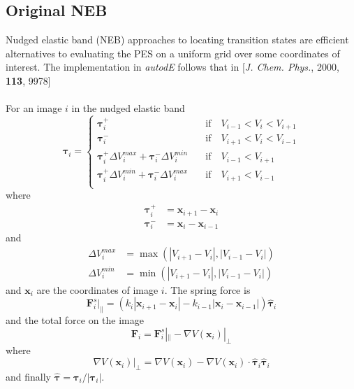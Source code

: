 \documentclass[10pt]{article}
\begin{document}
\subsection{Original NEB}

Nudged elastic band (NEB) approaches to locating transition states are efficient alternatives to evaluating the PES on a uniform grid over some coordinates of interest. The implementation in \emph{autodE} follows that in [\emph{J. Chem. Phys.}, 2000, {\bfseries{113}}, 9978]
\\\\
For an image $i$ in the nudged elastic band
\begin{equation}
\boldsymbol{\tau}_i =
\begin{cases}
\boldsymbol{\tau}_i^+ &\quad\text{if}\quad V_{i-1} < V_i < V_{i+1} \\
\boldsymbol{\tau}_i^- &\quad\text{if}\quad V_{i+1} < V_i < V_{i-1} \\
\boldsymbol{\tau}_i^+\Delta V_i^{max} + \boldsymbol{\tau}_i^-\Delta V_i^{min} &\quad\text{if}\quad V_{i-1} <  V_{i+1} \\
\boldsymbol{\tau}_i^+\Delta V_i^{min} + \boldsymbol{\tau}_i^-\Delta V_i^{max} &\quad\text{if}\quad V_{i+1} < V_{i-1} \\
\end{cases}
\end{equation}
where
\begin{equation}
\begin{aligned}
\boldsymbol{\tau}_i^+ &= \boldsymbol{x}_{i+1} - \boldsymbol{x}_i \\
\boldsymbol{\tau}_i^- &= \boldsymbol{x}_{i} - \boldsymbol{x}_{i-1}
\end{aligned}
\end{equation}
and
\begin{equation}
\begin{aligned}
\Delta V_i^{max} &= \max(|V_{i+1} - V_i|, |V_{i-1} - V_i|) \\
\Delta V_i^{min} &= \min(|V_{i+1} - V_i|, |V_{i-1} - V_i|)
\end{aligned}
\end{equation}
and $\boldsymbol{x}_i$ are the coordinates of image $i$. The spring force is
\begin{equation}
\boldsymbol{F}^s_i|_{\parallel} = (k_i|\boldsymbol{x}_{i+1} - \boldsymbol{x}_i| - k_{i-1}|\boldsymbol{x}_i - \boldsymbol{x}_{i-1}|) \hat{\boldsymbol{\tau}}_i
\end{equation}
and the total force on the image
\begin{equation}
\boldsymbol{F}_i = \boldsymbol{F}^s_i|_{\parallel} - \nabla V(\boldsymbol{x}_i)|_\perp
\end{equation}
where
\begin{equation}
\nabla V(\boldsymbol{x}_i)|_\perp = \nabla V(\boldsymbol{x}_i) - \nabla V(\boldsymbol{x}_i)\cdot \hat{\boldsymbol{\tau}}_i\hat{\boldsymbol{\tau}}_i
\end{equation}
and finally $\hat{\boldsymbol{\tau}} = \boldsymbol{\tau}_i/|\boldsymbol{\tau}_i|$.
\\\\
\end{document}
